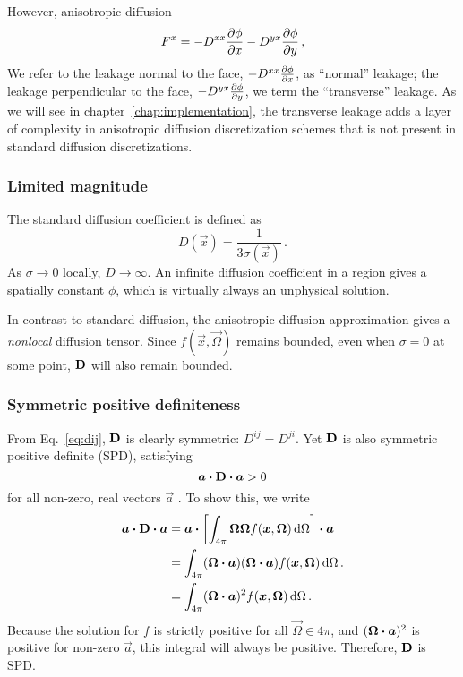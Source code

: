 However, anisotropic diffusion 
\begin{equation*}
  F^x = - D^{xx} \frac{\partial \phi}{\partial x} - D^{yx} \frac{\partial \phi}{\partial y}\,,
\end{equation*}
We refer to the leakage normal to the face, $- D^{xx} \frac{\partial \phi}{\partial x}$, as
``normal'' leakage; the leakage perpendicular to the face, $- D^{yx}
\frac{\partial \phi}{\partial y}$, we term the ``transverse'' leakage. As we will see in
chapter~\ref{chap:implementation}, the transverse leakage adds a layer of
complexity in anisotropic diffusion discretization schemes that is not present
in standard diffusion discretizations.

\subsubsection{Limited magnitude}
The standard diffusion coefficient is defined as
\begin{equation*}
  D(\vec{x}) = \frac{1}{3\sigma(\vec{x})} \,.
\end{equation*}
As $\sigma\to0$ locally, $D\to \infty$. An infinite diffusion coefficient in a
region gives a spatially constant $\phi$, which is virtually always an
unphysical solution.

In contrast to standard diffusion, the anisotropic diffusion approximation gives
a \emph{nonlocal} diffusion tensor. Since $f(\vec{x}, \vec{\Omega})$ remains
bounded, even when $\sigma=0$ at some point, $\mathbf{D}$ will also remain bounded.

\subsubsection{Symmetric positive definiteness}
From Eq.~\eqref{eq:dij}, $\mathbf{D}$ is clearly symmetric: $D^{ij}=D^{ji}$. Yet
$\mathbf{D}$ is also symmetric positive definite (SPD), satisfying
\begin{equation*}
  \bm{a} \bm{\cdot} \mathbf{D} \bm{\cdot} \bm{a} > 0
\end{equation*}
for all non-zero, real vectors $\vec{a}$ \cite{Tre1997}. To show this, we write 
\begin{align*}
  \bm{a} \bm{\cdot} \mathbf{D} \bm{\cdot} \bm{a} &=
  \bm{a} \bm{\cdot} \left[\int_{4\pi} \bm{\Omega} \bm{\Omega}
  f(\bm{x}, \bm{\Omega}) \mathop{}\!\mathrm{d}\Omega\right] \bm{\cdot} \bm{a}
  \\
  &=
  \int_{4\pi} (\bm{\Omega} \bm{\cdot}
  \bm{a}) (\bm{\Omega} \bm{\cdot} \bm{a})
  f(\bm{x}, \bm{\Omega}) \mathop{}\!\mathrm{d}\Omega\,.
  \\
  &=
  \int_{4\pi} (\bm{\Omega} \bm{\cdot} \bm{a})^2
  f(\bm{x}, \bm{\Omega}) \mathop{}\!\mathrm{d}\Omega\,.
\end{align*}
Because the solution for $f$ is strictly positive for all $\vec{\Omega}\in
4\pi$, and $(\bm{\Omega} \bm{\cdot} \bm{a})^2$ is positive for non-zero
$\vec{a}$, this integral will always be positive. Therefore, $\mathbf{D}$ is SPD.

